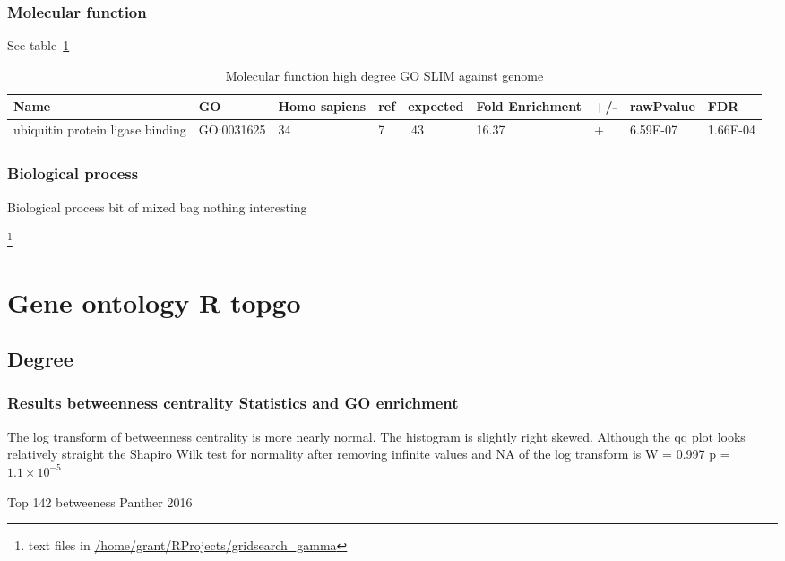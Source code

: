 \subsubsection{Molecular function}
See table~\ref{tab:Molecular function high degree GO SLIM against genome}
\begin{table}
\centering
\begin{adjustbox}{max width=\textwidth}
\begin{tabular}{lllllllll}
  Name & GO&	Homo sapiens &ref &	expected &	Fold Enrichment &	+/-	&rawPvalue&FDR\\
\hline
ubiquitin protein ligase binding&GO:0031625&	34&	7&	.43&	16.37&	+&	6.59E-07&	1.66E-04\\
\end{tabular}
\end{adjustbox}
\caption{Molecular function high degree GO SLIM against genome}
\label{tab:Molecular function high degree GO SLIM against genome}
\end{table}

\subsubsection{Biological process}
Biological process bit of mixed bag nothing interesting 

\footnote{text files in \url{/home/grant/RProjects/gridsearch_gamma}}

\section{Gene ontology R topgo}
\subsection{Degree}


\subsubsection{Results betweenness centrality Statistics and GO enrichment}
The log transform of betweenness centrality is more nearly normal. The histogram is slightly right skewed.
Although the qq plot looks relatively straight the Shapiro Wilk test for normality after removing infinite values and NA of the log transform  is 
W = 0.997 p = $1.1 \times 10^{-5}$

Top 142 betweeness
Panther 2016

